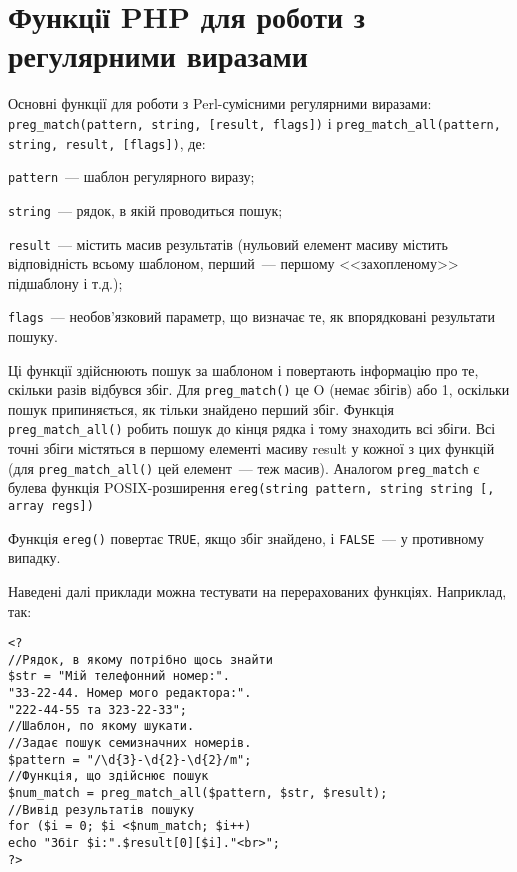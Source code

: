 \pagebreak[3]
\section{Функції PHP для роботи з регулярними виразами}
\nopagebreak[4]
Основні функції для роботи з Perl-сумісними регулярними виразами: \verb'preg_match(pattern, string, [result, flags])' і \verb'preg_match_all(pattern, string, result, [flags])', де:

\verb'pattern'~--- шаблон регулярного виразу;

\verb'string'~--- рядок, в якій проводиться пошук;

\verb'result'~--- містить масив результатів (нульовий елемент масиву містить відповідність всьому шаблоном, перший~--- першому <<захопленому>> підшаблону і т.д.);

\verb'flags'~--- необов'язковий параметр, що визначає те, як впорядковані результати пошуку.

Ці функції здійснюють пошук за шаблоном і повертають інформацію про те, скільки разів відбувся збіг. Для \verb'preg_match()' це O (немає збігів) або 1, оскільки пошук припиняється, як тільки знайдено перший збіг. Функція \verb'preg_match_all()' робить пошук до кінця рядка і тому знаходить всі збіги. Всі точні збіги містяться в першому елементі масиву result у кожної з цих функцій (для \verb'preg_match_all()' цей елемент~--- теж масив). 
Аналогом \verb'preg_match' є булева функція POSIX-розширення \verb'ereg(string pattern, string string [, array regs])'

Функція \verb'ereg()' повертає \verb'TRUE', якщо збіг знайдено, і \verb'FALSE'~--- у противному випадку.

Наведені далі приклади можна тестувати на перерахованих функціях. Наприклад, так:



\begin{lstlisting}[caption=Приклад роботи з регулярними виразами]
<?
//Рядок, в якому потрібно щось знайти
$str = "Мій телефонний номер:".
"33-22-44. Номер мого редактора:".
"222-44-55 та 323-22-33";
//Шаблон, по якому шукати.
//Задає пошук семизначних номерів.
$pattern = "/\d{3}-\d{2}-\d{2}/m";
//Функція, що здійснює пошук
$num_match = preg_match_all($pattern, $str, $result);
//Вивід результатів пошуку
for ($i = 0; $i <$num_match; $i++) 
echo "Збіг $i:".$result[0][$i]."<br>";
?>
\end{lstlisting}






